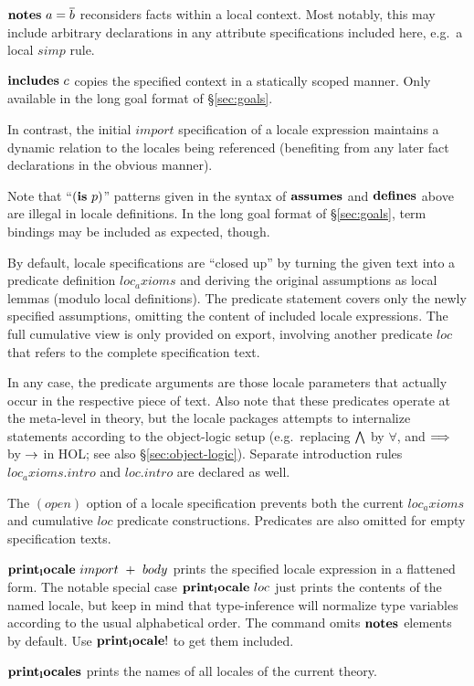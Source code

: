 \begin{descr}
\begin{descr}
  \item [$\NOTES{a}{\vec b}$] reconsiders facts within a local context.  Most
    notably, this may include arbitrary declarations in any attribute
    specifications included here, e.g.\ a local $simp$ rule.

  \item [${\mathord{\mathbf{includes}}}~c$] copies the specified context in a statically scoped
    manner.  Only available in the long goal format of \S\ref{sec:goals}.

    In contrast, the initial $import$ specification of a locale expression
    maintains a dynamic relation to the locales being referenced (benefiting
    from any later fact declarations in the obvious manner).
  \end{descr}
  
  Note that ``$({\mathord{\mathbf{is}}}~p)$'' patterns given in the syntax of ${\mathord{\mathbf{assumes}}}$ and
  ${\mathord{\mathbf{defines}}}$ above are illegal in locale definitions.  In the long goal
  format of \S\ref{sec:goals}, term bindings may be included as expected,
  though.
  
  \medskip By default, locale specifications are ``closed up'' by turning the
  given text into a predicate definition $loc_axioms$ and deriving the
  original assumptions as local lemmas (modulo local definitions).  The
  predicate statement covers only the newly specified assumptions, omitting
  the content of included locale expressions.  The full cumulative view is
  only provided on export, involving another predicate $loc$ that refers to
  the complete specification text.
  
  In any case, the predicate arguments are those locale parameters that
  actually occur in the respective piece of text.  Also note that these
  predicates operate at the meta-level in theory, but the locale packages
  attempts to internalize statements according to the object-logic setup
  (e.g.\ replacing $\bigwedge$ by $\forall$, and $\Longrightarrow$ by $\rightarrow$ in HOL; see
  also \S\ref{sec:object-logic}).  Separate introduction rules
  $loc_axioms.intro$ and $loc.intro$ are declared as well.
  
  The $(open)$ option of a locale specification prevents both the current
  $loc_axioms$ and cumulative $loc$ predicate constructions.  Predicates are
  also omitted for empty specification texts.

\item [${\mathord{\mathbf{print_locale}}}~import~+~body$] prints the specified locale
  expression in a flattened form.  The notable special case
  ${\mathord{\mathbf{print_locale}}}~loc$ just prints the contents of the named
  locale, but keep in mind that type-inference will normalize type variables
  according to the usual alphabetical order.  The command omits
  ${\mathord{\mathbf{notes}}}$ elements by default.  Use
  ${\mathord{\mathbf{print_locale}}}!$ to get them included.

\item [${\mathord{\mathbf{print_locales}}}$] prints the names of all locales of the
  current theory.

\end{descr}


